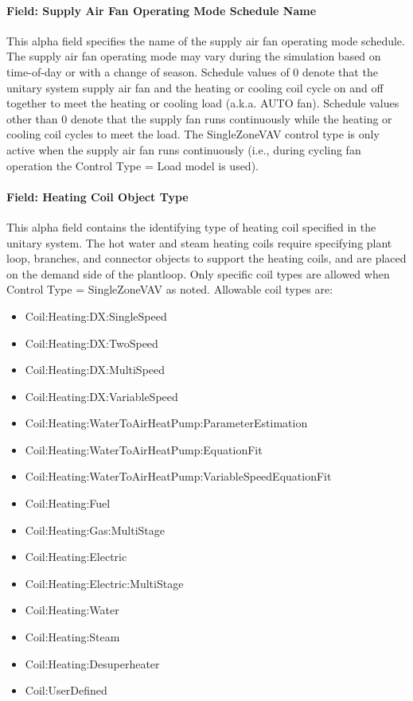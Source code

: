 \paragraph{Field: Supply Air Fan Operating Mode Schedule Name}\label{supply-air-fan-operating-mode-schedule-name}

This alpha field specifies the name of the supply air fan operating mode schedule. The supply air fan operating mode may vary during the simulation based on time-of-day or with a change of season. Schedule values of 0 denote that the unitary system supply air fan and the heating or cooling coil cycle on and off together to meet the heating or cooling load (a.k.a. AUTO fan). Schedule values other than 0 denote that the supply fan runs continuously while the heating or cooling coil cycles to meet the load. The SingleZoneVAV control type is only active when the supply air fan runs continuously (i.e., during cycling fan operation the Control Type = Load model is used).

\paragraph{Field: Heating Coil Object Type}\label{field-heating-coil-object-type-002}

This alpha field contains the identifying type of heating coil specified in the unitary system. The hot water and steam heating coils require specifying plant loop, branches, and connector objects to support the heating coils, and are placed on the demand side of the plantloop. Only specific coil types are allowed when Control Type = SingleZoneVAV as noted. Allowable coil types are:

\begin{itemize}
\item
  Coil:Heating:DX:SingleSpeed
\item
  Coil:Heating:DX:TwoSpeed
\item
  Coil:Heating:DX:MultiSpeed
\item
  Coil:Heating:DX:VariableSpeed
\item
  Coil:Heating:WaterToAirHeatPump:ParameterEstimation
\item
  Coil:Heating:WaterToAirHeatPump:EquationFit
\item
  Coil:Heating:WaterToAirHeatPump:VariableSpeedEquationFit
\item
  Coil:Heating:Fuel
\item
  Coil:Heating:Gas:MultiStage
\item
  Coil:Heating:Electric
\item
  Coil:Heating:Electric:MultiStage
\item
  Coil:Heating:Water
\item
  Coil:Heating:Steam
\item
  Coil:Heating:Desuperheater
\item
  Coil:UserDefined
\end{itemize}

